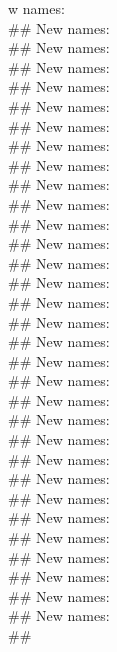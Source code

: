 \documentclass{article}\usepackage[]{graphicx}\usepackage[]{xcolor}
\makeatletter
\newenvironment{kframe}{%
 \def\at@end@of@kframe{}%
 \ifinner\ifhmode%
  \def\at@end@of@kframe{\end{minipage}}%
  \begin{minipage}{\columnwidth}%
 \fi\fi%
 \def\FrameCommand##1{\hskip\@totalleftmargin \hskip-\fboxsep
 \colorbox{shadecolor}{##1}\hskip-\fboxsep
     \hskip-\linewidth \hskip-\@totalleftmargin \hskip\columnwidth}%
 \MakeFramed {\advance\hsize-\width
   \@totalleftmargin\z@ \linewidth\hsize
   \@setminipage}}%
 {\par\unskip\endMakeFramed%
 \at@end@of@kframe}
\makeatother
\begin{document}
\begin{kframe}
w names:\\\#\# New names:\\\#\# New names:\\\#\# New names:\\\#\# New names:\\\#\# New names:\\\#\# New names:\\\#\# New names:\\\#\# New names:\\\#\# New names:\\\#\# New names:\\\#\# New names:\\\#\# New names:\\\#\# New names:\\\#\# New names:\\\#\# New names:\\\#\# New names:\\\#\# New names:\\\#\# New names:\\\#\# New names:\\\#\# New names:\\\#\# New names:\\\#\# New names:\\\#\# New names:\\\#\# New names:\\\#\# New names:\\\#\# New names:\\\#\# New names:\\\#\# New names:\\\#\# New names:\\\#\# New names:\\\#\# New names:\\\#\#
\end{kframe}
\end{document}
